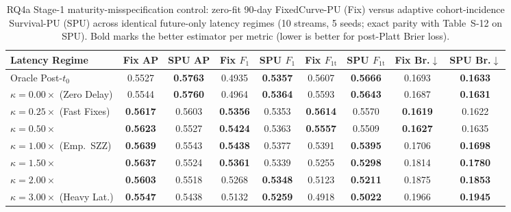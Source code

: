 \documentclass[10pt,a4paper]{article}
\begin{document}
\begin{table}[!htbp]
\centering
\caption{RQ4a Stage-1 maturity-misspecification control: zero-fit 90-day FixedCurve-PU (Fix) versus adaptive cohort-incidence Survival-PU (SPU) across identical future-only latency regimes (10 streams, 5 seeds; exact parity with Table~S-12 on SPU). Bold marks the better estimator per metric (lower is better for post-Platt Brier loss).}
\label{tab:rq4a_fixedcurve}
\fontsize{7.5}{9.0}\selectfont
\setlength{\tabcolsep}{2.0pt}
\begin{tabular*}{\textwidth}{@{\extracolsep\fill}lcccccccc@{}}
\toprule
\textbf{Latency Regime} & \textbf{Fix AP} & \textbf{SPU AP} & \textbf{Fix $F_1$} & \textbf{SPU $F_1$} & \textbf{Fix $F_{1\mathrm{t}}$} & \textbf{SPU $F_{1\mathrm{t}}$} & \textbf{Fix Br.$\downarrow$} & \textbf{SPU Br.$\downarrow$} \\
\midrule
Oracle Post-$t_0$ & 0.5527 & \textbf{0.5763} & 0.4935 & \textbf{0.5357} & 0.5607 & \textbf{0.5666} & 0.1693 & \textbf{0.1633} \\
\midrule
$\kappa = 0.00\times$ (Zero Delay) & 0.5544 & \textbf{0.5760} & 0.4964 & \textbf{0.5364} & 0.5593 & \textbf{0.5643} & 0.1687 & \textbf{0.1631} \\
$\kappa = 0.25\times$ (Fast Fixes) & \textbf{0.5617} & 0.5603 & \textbf{0.5356} & 0.5353 & \textbf{0.5614} & 0.5570 & \textbf{0.1619} & 0.1622 \\
$\kappa = 0.50\times$ & \textbf{0.5623} & 0.5527 & \textbf{0.5424} & 0.5363 & \textbf{0.5557} & 0.5509 & \textbf{0.1627} & 0.1635 \\
$\kappa = 1.00\times$ (Emp.\ SZZ) & \textbf{0.5639} & 0.5543 & \textbf{0.5438} & 0.5377 & 0.5391 & \textbf{0.5395} & 0.1706 & \textbf{0.1698} \\
$\kappa = 1.50\times$ & \textbf{0.5637} & 0.5524 & \textbf{0.5361} & 0.5339 & 0.5255 & \textbf{0.5298} & 0.1814 & \textbf{0.1780} \\
$\kappa = 2.00\times$ & \textbf{0.5603} & 0.5518 & 0.5268 & \textbf{0.5348} & 0.5123 & \textbf{0.5211} & 0.1875 & \textbf{0.1853} \\
$\kappa = 3.00\times$ (Heavy Lat.) & \textbf{0.5547} & 0.5438 & 0.5132 & \textbf{0.5259} & 0.4918 & \textbf{0.5022} & 0.1966 & \textbf{0.1945} \\
\bottomrule
\end{tabular*}
\end{table}
\end{document}
